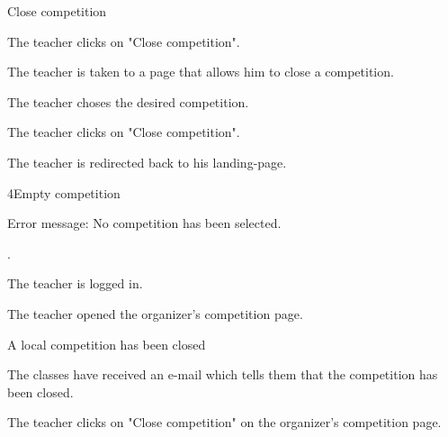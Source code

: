 \begin{uc}{Close competition}

    \begin{uc-mss}
    \item The teacher clicks on "Close competition".
    \item The teacher is taken to a page that allows him to close a competition.
    \item The teacher choses the desired competition.
    \item The teacher clicks on "Close competition".
    \item The teacher is redirected back to his landing-page.
    \end{uc-mss}

    \begin{uc-ext}
	\begin{uc-fail}{4}{Empty competition}
	\item Error message: No competition has been selected.
	\item {}.
	\end{uc-fail}
    \end{uc-ext}

    \begin{uc-pre}
    	\item The teacher is logged in.
    	\item The teacher opened the organizer's competition page.
    \end{uc-pre}

    \begin{uc-post}
    \item A local competition has been closed
    \item The classes have received an e-mail which tells them that the competition has been closed.
    \end{uc-post}

    \begin{uc-trig}
        The teacher clicks on "Close competition" on the organizer's competition page.
    \end{uc-trig}

\end{uc}
